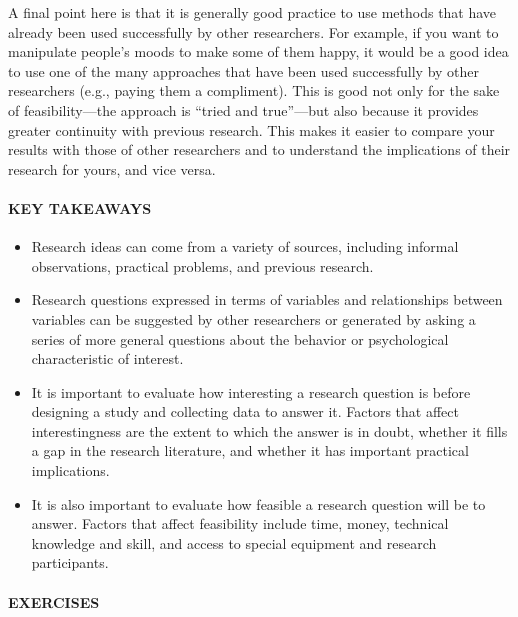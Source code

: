 \documentclass[
]{krantz}
\providecommand{\tightlist}{%
  \setlength{\itemsep}{0pt}\setlength{\parskip}{0pt}}
\begin{document}
A final point here is that it is generally good practice to use methods that have already been used successfully by other researchers. For example, if you want to manipulate people's moods to make some of them happy, it would be a good idea to use one of the many approaches that have been used successfully by other researchers (e.g., paying them a compliment). This is good not only for the sake of feasibility---the approach is ``tried and true''---but also because it provides greater continuity with previous research. This makes it easier to compare your results with those of other researchers and to understand the implications of their research for yours, and vice versa.

\paragraph*{KEY TAKEAWAYS}\label{key-takeaways-25}

\begin{itemize}
\tightlist
\item
  Research ideas can come from a variety of sources, including informal observations, practical problems, and previous research.
\item
  Research questions expressed in terms of variables and relationships between variables can be suggested by other researchers or generated by asking a series of more general questions about the behavior or psychological characteristic of interest.
\item
  It is important to evaluate how interesting a research question is before designing a study and collecting data to answer it. Factors that affect interestingness are the extent to which the answer is in doubt, whether it fills a gap in the research literature, and whether it has important practical implications.
\item
  It is also important to evaluate how feasible a research question will be to answer. Factors that affect feasibility include time, money, technical knowledge and skill, and access to special equipment and research participants.
\end{itemize}

\paragraph*{EXERCISES}\label{exercises-21}
\end{document}
